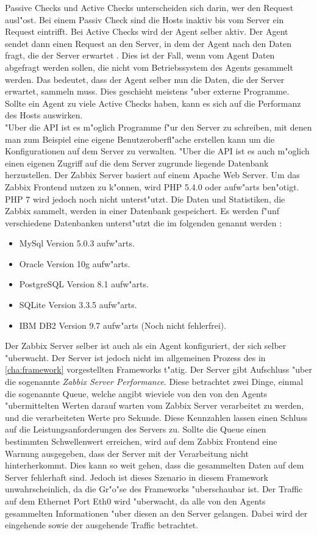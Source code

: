 Passive Checks und Active Checks unterscheiden sich darin, wer den Request %
ausl"ost. Bei einem Passiv Check sind die Hosts inaktiv bis vom Server ein Request eintrifft. Bei Active %
Checks wird der Agent selber aktiv. Der Agent sendet dann einen Request an den Server, in dem der Agent nach den %
Daten fragt, die der Server erwartet \autocite{zabbix:activepassive2}. %
Dies ist der Fall, wenn vom Agent Daten abgefragt werden sollen, die nicht vom %
Betriebssystem des Agents gesammelt werden. Das bedeutet, dass der Agent selber nun die Daten, die der Server erwartet, %
sammeln muss. Dies geschieht meistens "uber externe Programme. Sollte ein Agent zu viele Active Checks haben, kann es %
sich auf die Performanz des Hosts auswirken. \ \\ %

"Uber die API ist es m"oglich Programme f"ur den Server zu schreiben, mit denen man zum Beispiel %
eine eigene Benutzeroberfl"ache erstellen kann um die Konfigurationen auf dem Server zu verwalten. %
"Uber die API ist es auch m"oglich einen eigenen Zugriff auf die dem Server zugrunde liegende %
Datenbank herzustellen. %
Der Zabbix Server basiert auf einem Apache Web Server. Um das Zabbix Frontend nutzen zu k"onnen, wird %
PHP 5.4.0 oder aufw"arts ben"otigt. PHP 7 wird jedoch noch nicht unterst"utzt. Die Daten und Statistiken, die Zabbix sammelt, %
werden in einer Datenbank gespeichert. Es werden f"unf verschiedene Datenbanken unterst"utzt die im folgenden genannt werden \autocite{zabbix:req}: %
\begin{itemize}
\item MySql Version 5.0.3 aufw"arts.
\item Oracle Version 10g aufw"arts.
\item PostgreSQL Version 8.1 aufw"arts.
\item SQLite Version 3.3.5 aufw"arts.
\item IBM DB2 Version 9.7 aufw"arts (Noch nicht fehlerfrei).
\end{itemize}
Der Zabbix Server selber ist auch als ein Agent konfiguriert, der sich selber "uberwacht. Der Server %
ist jedoch nicht im allgemeinen Prozess des in \cref{cha:framework} vorgestellten Frameworks t"atig. %
Der Server gibt Aufschluss "uber die sogenannte \emph{Zabbix Server Performance}. Diese betrachtet zwei Dinge, einmal die sogenannte Queue, welche %
angibt wieviele von den von den Agents "ubermittelten Werten darauf warten vom Zabbix Server verarbeitet zu werden, und %
die verarbeiteten Werte pro Sekunde. Diese Kennzahlen lassen einen Schluss auf die Leistungsanforderungen des Servers zu. %
Sollte die Queue einen bestimmten Schwellenwert erreichen, wird auf dem Zabbix Frontend eine Warnung ausgegeben, dass der %
Server mit der Verarbeitung nicht hinterherkommt. Dies kann so weit gehen, dass die gesammelten Daten auf dem Server fehlerhaft %
sind. Jedoch ist dieses Szenario in diesem Framework unwahrscheinlich, da die Gr"o"se des %
Frameworks "uberschaubar ist. Der Traffic auf dem Ethernet Port Eth0 wird "uberwacht, da alle von den Agents gesammelten Informationen %
"uber diesen an den Server gelangen. Dabei wird der eingehende sowie der ausgehende Traffic betrachtet.


